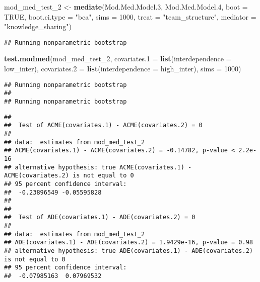 \documentclass[]{article}
\newenvironment{Shaded}{\begin{snugshade}}{\end{snugshade}}
\newcommand{\DataTypeTok}[1]{\textcolor[rgb]{0.13,0.29,0.53}{#1}}
\newcommand{\DecValTok}[1]{\textcolor[rgb]{0.00,0.00,0.81}{#1}}
\newcommand{\FloatTok}[1]{\textcolor[rgb]{0.00,0.00,0.81}{#1}}
\newcommand{\KeywordTok}[1]{\textcolor[rgb]{0.13,0.29,0.53}{\textbf{#1}}}
\newcommand{\NormalTok}[1]{#1}
\newcommand{\OtherTok}[1]{\textcolor[rgb]{0.56,0.35,0.01}{#1}}
\newcommand{\StringTok}[1]{\textcolor[rgb]{0.31,0.60,0.02}{#1}}
\begin{document}
\begin{Shaded}
\begin{Highlighting}[]
\NormalTok{mod_med_test_}\DecValTok{2}\NormalTok{ <-}\StringTok{ }\KeywordTok{mediate}\NormalTok{(Mod.Med.Model}\FloatTok{.3}\NormalTok{, Mod.Med.Model}\FloatTok{.4}\NormalTok{,}
                             \DataTypeTok{boot =} \OtherTok{TRUE}\NormalTok{,}
                             \DataTypeTok{boot.ci.type =} \StringTok{"bca"}\NormalTok{,}
                             \DataTypeTok{sims =} \DecValTok{1000}\NormalTok{, }\DataTypeTok{treat =} \StringTok{"team_structure"}\NormalTok{, }
                             \DataTypeTok{mediator =} \StringTok{"knowledge_sharing"}\NormalTok{)}
\end{Highlighting}
\end{Shaded}

\begin{verbatim}
## Running nonparametric bootstrap
\end{verbatim}

\begin{Shaded}
\begin{Highlighting}[]
\KeywordTok{test.modmed}\NormalTok{(mod_med_test_}\DecValTok{2}\NormalTok{, }\DataTypeTok{covariates.1 =} \KeywordTok{list}\NormalTok{(}\DataTypeTok{interdependence =}\NormalTok{ low_inter), }\DataTypeTok{covariates.2 =} \KeywordTok{list}\NormalTok{(}\DataTypeTok{interdependence =}\NormalTok{ high_inter), }\DataTypeTok{sims =} \DecValTok{1000}\NormalTok{)}
\end{Highlighting}
\end{Shaded}

\begin{verbatim}
## Running nonparametric bootstrap
## 
## Running nonparametric bootstrap
\end{verbatim}

\begin{verbatim}
## 
##  Test of ACME(covariates.1) - ACME(covariates.2) = 0
## 
## data:  estimates from mod_med_test_2
## ACME(covariates.1) - ACME(covariates.2) = -0.14782, p-value < 2.2e-16
## alternative hypothesis: true ACME(covariates.1) - ACME(covariates.2) is not equal to 0
## 95 percent confidence interval:
##  -0.23896549 -0.05595828
## 
## 
##  Test of ADE(covariates.1) - ADE(covariates.2) = 0
## 
## data:  estimates from mod_med_test_2
## ADE(covariates.1) - ADE(covariates.2) = 1.9429e-16, p-value = 0.98
## alternative hypothesis: true ADE(covariates.1) - ADE(covariates.2) is not equal to 0
## 95 percent confidence interval:
##  -0.07985163  0.07969532
\end{verbatim}
\end{document}

